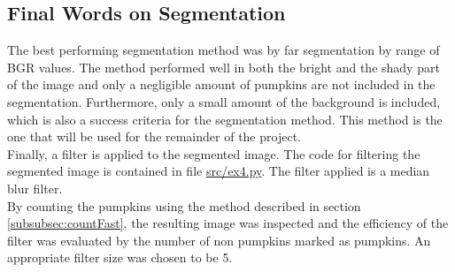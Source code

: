 \documentclass[../Head/Main.tex]{subfiles}
\begin{document}
\subsection{Final Words on Segmentation}
The best performing segmentation method was by far segmentation by range of BGR values. The method performed well in both the bright and the shady part of the image and only a negligible amount of pumpkins are not included in the segmentation. Furthermore, only a small amount of the background is included, which is also a success criteria for the segmentation method. This method is the one that will be used for the remainder of the project.\\
Finally, a filter is applied to the segmented image. The code for filtering the segmented image is contained in file \url{src/ex4.py}. The filter applied is a median blur filter.\\
By counting the pumpkins using the method described in section \ref{subsubsec:countFast}, the resulting image was inspected and the efficiency of the filter was evaluated by the number of non pumpkins marked as pumpkins. An appropriate filter size was chosen to be 5.
\end{document}
